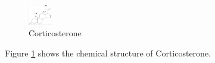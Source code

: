 \documentclass{article}
\begin{document}
	\begin{figure}[ht!]
		\includegraphics[width=10mm]{chemicals.png}
		\caption{\label{fig:chemicals}Corticosterone}
	\end{figure}
Figure \ref{fig:chemicals} shows the chemical structure of Corticosterone.
\end{document}
